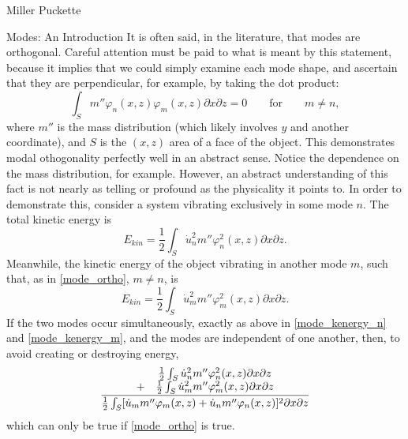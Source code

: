 \documentclass[a4paper,10pt]{report}
\numberwithin{equation}{section}
\begin{document}
\begin{chapter}{Miller Puckette}
\begin{section}{Modes: An Introduction}
It is often said, in the literature, that modes are orthogonal. Careful attention must be paid to what is meant by this statement, because it implies that we could simply examine each mode shape, and ascertain that they are perpendicular, for example, by taking the dot product\cite[p.~320]{Cremer1973}:
\begin{equation}\label{mode_ortho}
\int_S m'' \varphi_n(x,z) \varphi_m(x,z) \partial x \partial z = 0 \qquad \text{for} \qquad m \neq n ,
\end{equation}
where $m''$ is the mass distribution (which likely involves $y$ and another coordinate), and $S$ is the $(x, z)$ area of a face of the object. This demonstrates modal othogonality perfectly well in an abstract sense. Notice the dependence on the mass distribution, for example. However, an abstract understanding of this fact is not nearly as telling or profound as the physicality it points to. In order to demonstrate this, consider a system vibrating exclusively in some mode $n$. The total kinetic energy is \cite[p.~320]{Cremer1973}
\begin{equation}\label{mode_kenergy_n}
E_{kin} = \frac{1}{2} \int_S \dot{u}_n^2 m'' \varphi_n^2(x, z) \partial x \partial z \text{.}
\end{equation}
Meanwhile, the kinetic energy of the object vibrating in another mode $m$, such that, as in \eqref{mode_ortho}, $m \neq n$, is
\begin{equation}\label{mode_kenergy_m}
E_{kin} = \frac{1}{2} \int_S \dot{u}_m^2 m'' \varphi_m^2(x, z) \partial x \partial z \text{.}
\end{equation}
If the two modes occur simultaneously, exactly as above in \eqref{mode_kenergy_n} and \eqref{mode_kenergy_m}, and the modes are independent of one another, then, to avoid creating or destroying energy,
\begin{align}
\frac{
\begin{array}{c c}
&\frac{1}{2} \int_S \dot{u}_n^2 m'' \varphi_n^2(x, z) \partial x \partial z\\
+ &\frac{1}{2} \int_S \dot{u}_m^2 m'' \varphi_m^2(x, z) \partial x \partial z 
\end{array}
}{
\frac{1}{2}  \int_S [\dot{u}_m m'' \varphi_m(x, z) + \dot{u}_n m'' \varphi_n(x, z) ]^2 \partial x \partial z  
}
\end{align}
which can only be true if \eqref{mode_ortho} is true. \cite[p.~322]{Cremer1973}


\end{section}
\end{chapter}
\end{document}
